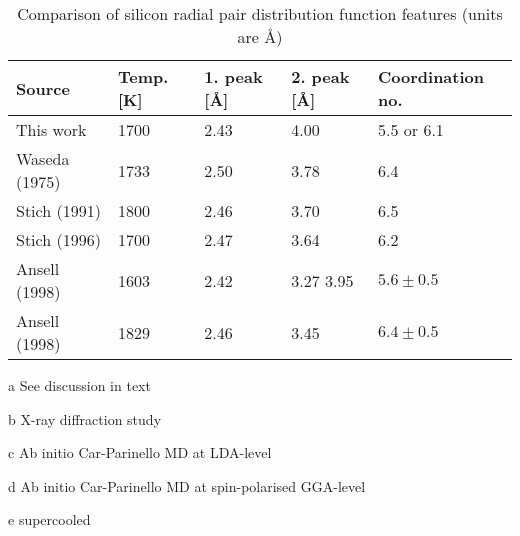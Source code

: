 \documentclass[11pt,bibliography=totoc,index=totoc]{scrbook}   %
\begin{document}
\begin{table}[htbp]
   \centering
   \begin{threeparttable}[htbp]
     \begin{tabular}{lllll}
        \toprule
          Source & Temp. [K] & 1. peak [Å] & 2. peak [Å] & Coordination no. \\
        \midrule
          This work 
          & 1700                  & 2.43 & 4.00       & 5.5 or 6.1\tnote{a}  \\
          Waseda (1975)\cite{Waseda:1975}\tnote{b}
            & 1733                  & 2.50 & 3.78       & 6.4   \\
          Stich (1991)\cite{Stich:1991}\tnote{c}    
            & 1800                  & 2.46 & 3.70       & 6.5   \\
          Stich (1996)\cite{Stich:1996}\tnote{d}    
            & 1700                  & 2.47 & 3.64       & 6.2   \\
          Ansell (1998)\cite{Ansell:1998}\tnote{b,e}
            & 1603                  & 2.42 & 3.27 3.95  & $5.6\pm 0.5$   \\
          Ansell (1998)\cite{Ansell:1998}\tnote{b}      
            & 1829                  & 2.46 & 3.45       & $6.4\pm 0.5$   \\
       \bottomrule
     \end{tabular}
     {\footnotesize
       \begin{tablenotes}
         \item[a] See discussion in text
         \item[b] X-ray diffraction study
         \item[c] Ab initio Car-Parinello MD at LDA-level
         \item[d] Ab initio Car-Parinello MD at spin-polarised GGA-level
         \item[e] supercooled
       \end{tablenotes}
     }
   \end{threeparttable}
   \caption{Comparison of silicon radial pair distribution function features (units are Å)}
   \label{tab:pcf}
\end{table}
\end{document}
